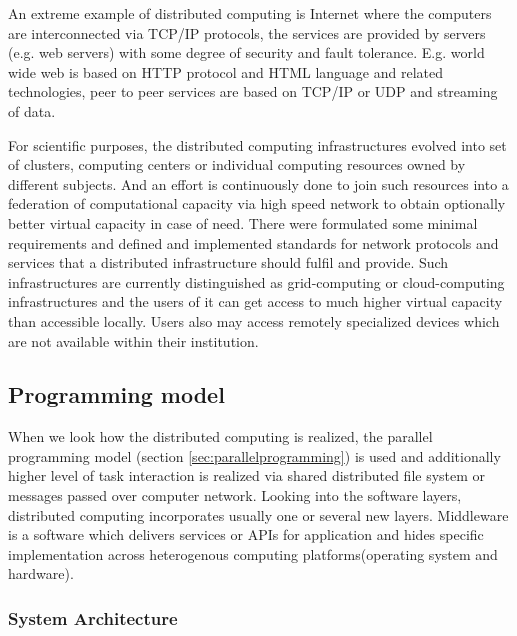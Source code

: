 An extreme example of distributed computing is Internet where the computers are interconnected via TCP/IP protocols, the services are provided by servers (e.g. web servers) with some degree of security and fault tolerance. E.g. world wide web is based on HTTP protocol and HTML language and related technologies, peer to peer services are based on TCP/IP or UDP and streaming of data.

For scientific purposes, the distributed computing infrastructures evolved into set of clusters, computing centers or individual computing resources owned by different subjects. And an effort is continuously done to join such resources into a federation of computational capacity via high speed network to obtain optionally better virtual capacity in case of need. There were formulated some minimal requirements and defined and implemented standards for network protocols and services that a distributed infrastructure should fulfil and provide. Such infrastructures are currently distinguished as grid-computing or cloud-computing infrastructures and the users of it can get access to much higher virtual capacity than accessible locally. Users also may access remotely specialized devices which are not available within their institution.

\subsection{Programming model}
\label{sec:distributedprogramming}

When we look how the distributed computing is realized, the parallel programming model (section \ref{sec:parallelprogramming}) is used and additionally higher level of task interaction is realized via shared distributed file system or messages passed over computer network. 
Looking into the software layers, distributed computing incorporates usually one or several new layers. Middleware is a software which delivers services or APIs for application and hides specific implementation across heterogenous computing platforms(operating system and hardware).

\subsubsection{System Architecture}

